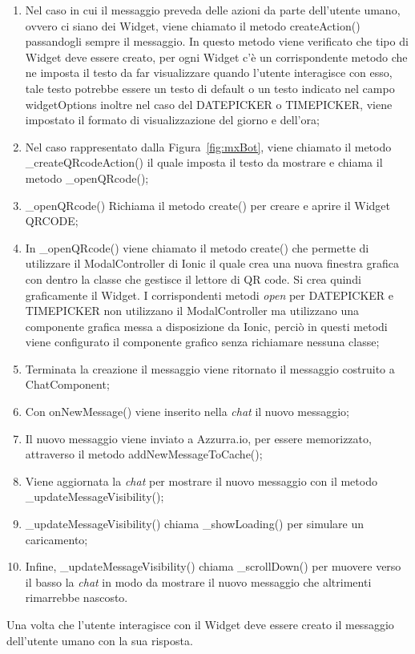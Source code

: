 \begin{enumerate}
	\item Nel caso in cui il messaggio preveda delle azioni da parte dell'utente umano, ovvero ci siano dei Widget, viene chiamato il metodo createAction() passandogli sempre il messaggio. In questo metodo viene verificato che tipo di Widget deve essere creato, per ogni Widget c'è un corrispondente metodo che ne imposta il testo da far visualizzare quando l'utente interagisce con esso, tale testo potrebbe essere un testo di default o un testo indicato nel campo widgetOptions inoltre nel caso del DATEPICKER o TIMEPICKER, viene impostato il formato di visualizzazione del giorno e dell'ora;
	\item Nel caso rappresentato dalla Figura~\ref{fig:mxBot}, viene chiamato il metodo \_createQRcodeAction()
	 il quale imposta il testo da mostrare e chiama il metodo \_openQRcode();
	\item \_openQRcode() Richiama il metodo create() per creare e aprire il Widget QRCODE;
	\item In \_openQRcode() viene chiamato il metodo create() che permette di utilizzare il ModalController di Ionic il quale crea una nuova finestra grafica con dentro la classe che gestisce il lettore di \gls{QR code}\ap{[g]}. Si crea quindi graficamente il Widget. I corrispondenti metodi \emph{open} per DATEPICKER e TIMEPICKER non utilizzano il ModalController ma utilizzano una componente grafica messa a disposizione da Ionic, perciò in questi metodi viene configurato il componente grafico senza richiamare nessuna classe;
	\item Terminata la creazione il messaggio viene ritornato il messaggio costruito a ChatComponent;
	\item Con onNewMessage() viene inserito nella \emph{chat} il nuovo messaggio;
	\item Il nuovo messaggio viene inviato a Azzurra.io, per essere memorizzato, attraverso il metodo addNewMessageToCache();
	\item Viene aggiornata la \emph{chat} per mostrare il nuovo messaggio con il metodo \_updateMessageVisibility();
	\item \_updateMessageVisibility() chiama \_showLoading() per simulare un caricamento;
	\item Infine, \_updateMessageVisibility() chiama \_scrollDown() per muovere verso il basso la \emph{chat} in modo da mostrare il nuovo messaggio che altrimenti rimarrebbe nascosto.
\end{enumerate}

Una volta che l'utente interagisce con il Widget deve essere creato il messaggio dell'utente umano con la sua risposta. 
\clearpage
